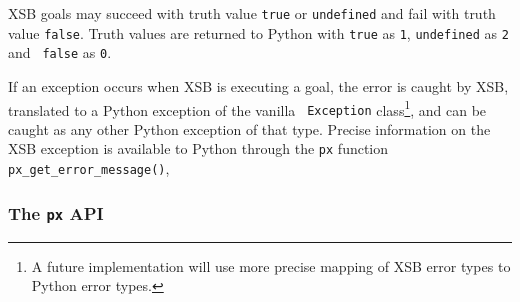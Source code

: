 XSB goals may succeed with truth value {\tt true} or {\tt undefined}
and fail with truth value {\tt false}.  Truth values are returned to
Python with {\tt true} as {\tt 1}, {\tt undefined} as {\tt 2} and {\tt
  false} as {\tt 0}.

If an exception occurs when XSB is executing a goal, the error is
caught by XSB, translated to a Python exception of the vanilla {\tt
  Exception} class\footnote{A future implementation will use more
  precise mapping of XSB error types to Python error types.}, and can
be caught as any other Python exception of that type.  Precise
information on the XSB exception is available to Python through the
{\tt px} function {\tt px\_get\_error\_message()},

\subsubsection{The {\tt px} API}

